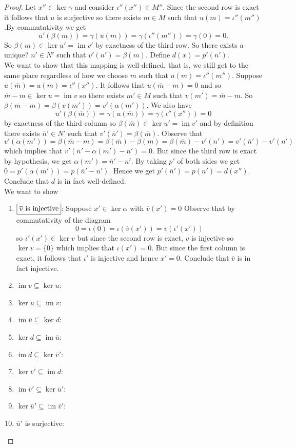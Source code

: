 \documentclass[8pt]{amsart}
\theoremstyle{plain}%
\theoremstyle{definition}
\theoremstyle{remark}
\numberwithin{equation}{section}
\newcommand{\im}{\operatorname{im}}
\begin{document}
\begin{proof}
	Let $x'' \in \ker \gamma$ and consider $\iota''(x'') \in M''$. Since the second row is exact it follows that $u$ is surjective so there exists $m \in M$ such that $\boxed{u(m) = \iota''(m'')}$.By commutativity we get $$u'(\beta(m)) = \gamma(u(m)) = \gamma(\iota''(m'')) = \gamma(0) = 0.$$ So $\beta(m) \in \ker u' = \im v'$ by exactness of the third row. So there exists {\color{red} a unique?} $n' \in N'$ such that $\boxed{v'(n') = \beta(m)}$. Define $\boxed{d(x) = p'(n')}$. \\

We want to show that this mapping is well-defined, that is, we still get to the same place regardless of how we choose $m$ such that $u(m) = \iota''(m'')$. Suppose $u (\overline m) = u(m) = \iota''(x'')$. It follows that $u(\overline m - m) = 0$ and so $\overline m - m \in \ker u = \im v$ so there exists $m' \in M$ such that $v(m') = \overline m - m$. So $\beta(\overline m - m) = \beta(v(m')) = v'(\alpha(m'))$. We also have $$u'(\beta(\overline m)) = \gamma(u(\overline m)) = \gamma(\iota''(x'')) = 0$$ by exactness of the third column so $\beta(\overline m) \in \ker u' = \im v'$ and by definition there exists $\overline n' \in N'$ such that $v'(\overline n') = \beta(\overline m)$. Observe that $$v'(\alpha(m')) = \beta(\overline m - m) = \beta(\overline m) - \beta(m) = \beta(\overline m) - v'(n') = v'(\overline n') - v'(n')$$ which implies that $v'(\overline n' - \alpha(m') - n') = 0$. But since the third row is exact by hypothesis, we get $\alpha(m') = \overline n' - n'$. By taking $p'$ of both sides we get $0 = p'(\alpha(m')) = p(\overline n' - n')$. Hence we get $p'(\overline n') = p
(n') = d(x'')$. Conclude that $d$ is in fact well-defined.\\

	We want to show
	\begin{enumerate}
		\item $\boxed{\overline v$ is injective$}$: Suppose $x' \in \ker \alpha$ with $\overline v (x') = 0$ Observe that by commutativity of the diagram $$0 = \iota(0) = \iota(\overline v (x')) = v(\iota'(x'))$$ so $\iota'(x') \in \ker v$ but since the second row is exact, $v$ is injective so $\ker v = \{0\}$ which implies that $\iota(x') = 0$. But since the first column is exact, it follows that $\iota'$ is injective and hence $x' = 0$. Conclude that $\overline v$ is in fact injective.
		\item $\im \overline v \subseteq \ker \overline u$:
		\item $\ker \overline u \subseteq \im \overline v$:
		\item $\im \overline u \subseteq \ker d$:
		\item $\ker d \subseteq \im \overline u$:
		\item $\im d \subseteq \ker \overline v'$:
		\item $\ker \overline v' \subseteq \im d$:
		\item $\im \overline v' \subseteq \ker \overline u'$:
		\item $\ker \overline u' \subseteq \im \overline v'$:
		\item $\overline u'$ is surjective:
	\end{enumerate}


	\end{proof}
\end{document}

